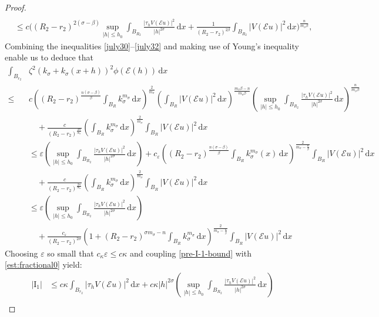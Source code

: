 \documentclass[leqno,11pt]{amsart}%
\numberwithin{equation}{section}
\def\d{\mathrm{d}}
\def\E{\mathcal{E}}
\def\dx{\d x}
\theoremstyle{definition}
\numberwithin{equation}{section}
\begin{document}
\begin{proof}
\begin{align}
\\ \nonumber
  & \leq  c
  {
  \bigg((R_2-r_2)^{2(\sigma-\beta)}
  }
  \sup_{{|h|\leq h_0}}\int_{B_{R_2}}\frac{|\tau_hV(\E u)|^2}{|h|^{2\sigma}}\,\dx+
  {
  \frac{1}{(R_2-r_2)^{2\beta}}
  }
  \int_{B_{R_2}}|V(\E u)|^2\,\dx\bigg)^{ {\frac{n}{{m_\sigma}\beta}}},
\end{align}
Combining the inequalities \eqref{july30}--\eqref{july32} and making use of Young's inequality enable us to deduce that
\begin{align}\label{est:fractional0}
\int_{B_{r_2}}&\zeta^2({k_\sigma}+{k_\sigma}(x+h))^2\phi(\E(h))\,\dx
  \\  \nonumber \le& c\left((R_2-r_2)^{ {\frac{n(\sigma-\beta)}{\beta}}}\int_{B_{R}}k_\sigma^{ {{m_\sigma}}} \,\dx\right)^{\frac{2}{ {{m_\sigma}}}}\left(\int_{B_{R}}|V(\E u)|^2\,\dx\right)^{ {\frac{{m_\sigma}\beta-n}{{m_\sigma}\beta}}}\left(\sup_{|h|\le h_0}\int_{B_{R_2}}\frac{|\tau_hV(\E u)|^2}{|h|^{2\sigma}}\,\dx\right)^{ {\frac{n}{{m_\sigma}\beta}}}
  \\ \nonumber  & \quad+\frac{c}{(R_2-r_2)^{ {\frac{2n}{{m_\sigma}}}}}
  \left(\int_{B_{R}}k_\sigma^{{m_\sigma}} \,\dx\right)^{\frac{2}{{m_\sigma}}}\int_{B_{R}}|V(\E u)|^2\,\dx
 \\ \nonumber & \leq 
  \varepsilon \left(\sup_{|h|\leq h_0}\int_{B_{R_2}}\frac{|\tau_hV(\E u)|^2}{|h|^{2\sigma}}\,\dx\right) +c_\varepsilon\left((R_2-r_2)^{ {\frac{n(\sigma-\beta)}{\beta}}}\int_{B_{R}}k_\sigma^{{m_\sigma}}(x)\,\dx\right)^{ {\frac{2}{{m_\sigma}-\frac{n}{\beta}}}}\int_{B_{R}}|V(\E u)|^2\,\dx\\ \nonumber & \quad  + { \frac{c}{(R_2-r_2)^{ {\frac{2n}{{m_\sigma}}}}}\left(\int_{B_{R}}k_\sigma^{{m_\sigma}}\,\dx\right)^{\frac{2}{{m_\sigma}}}\int_{B_{R}}|V(\E u)|^2\,\dx}\\
 \nonumber & \leq 
  \varepsilon \left(\sup_{|h|\leq h_0}\int_{B_{R_2}}\frac{|\tau_hV(\E u)|^2}{|h|^{2\sigma}}\,\dx\right) \\ \nonumber & \quad +
   {
  \frac{c_\varepsilon}{(R_2-r_2)^{2\sigma}}
  }\left({ 1}+(R_2-r_2)^{
 {
 \sigma {m_\sigma}-n
 }
 }
 \int_{B_{R}}k_\sigma^{{m_\sigma}}\,\dx\right)^{ {\frac{2}{{m_\sigma}-\frac{n}{\beta}}}}\int_{B_{R}}|V(\E u)|^2\,\dx
 \end{align}
 Choosing $\varepsilon$ so small that $c_\kappa \varepsilon \leq c \kappa$ and coupling  \eqref{pre-I-1-bound} with \eqref{est:fractional0} yield:
 \begin{align}\label{I-1-bound}
    |\mathrm{I}_1|
    &\le
      c\kappa \int_{B_{r_2}}|\tau_hV(\E u)|^2\,\dx+
     c\kappa |h|^{2\sigma} \left(\sup_{{|h|\leq h_0}}\int_{B_{R_2}}\frac{|\tau_hV(\E u)|^2}{|h|^{2\sigma}}\,\dx\right)\\\nonumber 

\end{align}
\end{proof}
\end{document}
